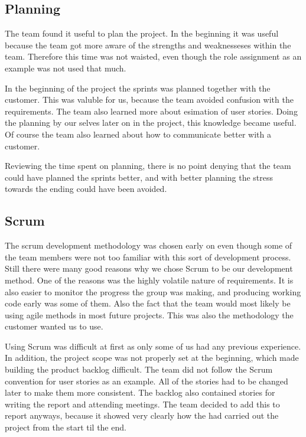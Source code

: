 \subsection{Planning}

The team found it useful to plan the project. In the beginning it was useful because the team got more aware of the strengths and weaknesseses within the team. Therefore this time was not waisted, even though the role assignment as an example was not used that much. 

In the beginning of the project the sprints was planned together with the customer. This was valuble for us, because the team avoided confusion with the requirements. The team also learned more about esimation of user stories. Doing the planning by our selves later on in the project, this knowledge became useful. Of course the team also learned about how to communicate better with a customer. 

Reviewing the time spent on planning, there is no point denying that the team could have planned the sprints better, and with better planning the stress towards the ending could have been avoided.   

\subsection{Scrum}
The scrum development methodology was chosen early on even though some of the team members were not too familiar with this sort of development process.
Still there were many good reasons why we chose Scrum to be our development method.
One of the reasons was the highly volatile nature of requirements.
It is also easier to monitor the progress the group was making, and producing working code early was some of them. Also the fact that the team would most likely be using agile methods in most future projects. 
This was also the methodology the customer wanted us to use. 

Using Scrum was difficult at first as only some of us had any previous experience. 
In addition, the project scope was not properly set at the beginning, which made building the product backlog difficult. 
The team did not follow the Scrum convention for user stories as an example. 
All of the stories had to be changed later to make them more consistent. 
The backlog also contained stories for writing the report and attending meetings.
The team decided to add this to report anyways, because it showed very clearly how the had carried out the project from the start til the end. 

